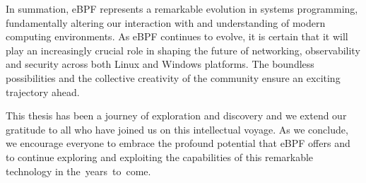 In summation, eBPF represents a remarkable evolution in systems programming, fundamentally altering our interaction with and understanding of modern computing environments. 
As eBPF continues to evolve, it is certain that it will play an increasingly crucial role in shaping the future of networking, observability and security across both Linux and Windows platforms. 
The boundless possibilities and the collective creativity of the community ensure an exciting trajectory ahead.

This thesis has been a journey of exploration and discovery and we extend our gratitude to all who have joined us on this intellectual voyage. 
As we conclude, we encourage everyone to embrace the profound potential that eBPF offers and to continue exploring and exploiting the capabilities of this remarkable technology in the years to come.
